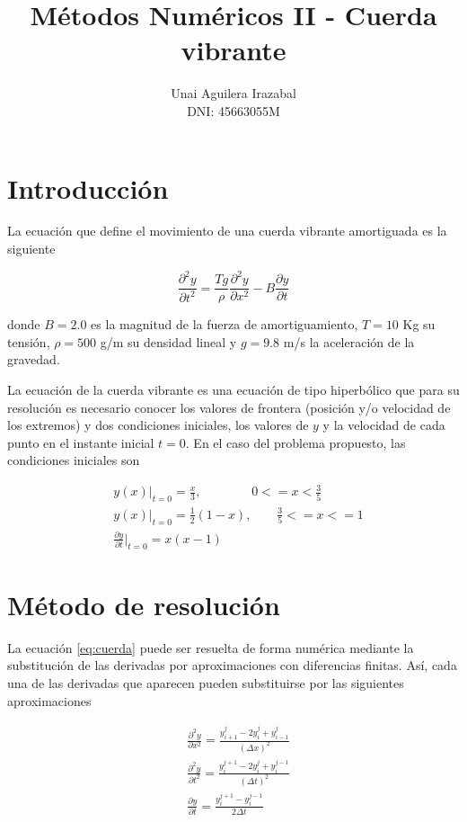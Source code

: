 \documentclass[11pt]{article}
\title{Métodos Numéricos II - Cuerda vibrante}
\author{Unai Aguilera Irazabal\\ DNI: 45663055M}
\begin{document}
\maketitle
\tableofcontents

\pagebreak
\renewcommand{\tablename}{Tabla}

\section{Introducción}
La ecuación que define el movimiento de una cuerda vibrante amortiguada es la siguiente

\begin{equation}
\frac{\partial^2 y}{\partial{t^2}} = \frac{Tg}{\rho}\frac{\partial^2 y}{\partial{x^2}} 
	- B\frac{\partial y}{\partial{t}}
\label{eq:cuerda}
\end{equation}

donde $B=2.0$ es la magnitud de la fuerza de amortiguamiento, $T=10$ Kg su tensión,
$\rho = 500$ g/m su densidad lineal y $g = 9.8$ m/s la aceleración de la gravedad. 

La ecuación de la cuerda vibrante es una ecuación de tipo hiperbólico que para su resolución
es necesario conocer los valores de frontera (posición y/o velocidad de los extremos) y
dos condiciones iniciales, los valores de $y$ y la velocidad de cada punto en el instante
inicial $t=0$.
En el caso del problema propuesto, las condiciones iniciales son

\begin{subequations}
\begin{flalign}
	&y(x)|_{t=0} = \frac{x}{3},~~~~~~~~~~~~~~~~~~ 0 <= x < \frac{3}{5}\\
	&y(x)|_{t=0} = \frac{1}{2}(1 - x),~~~~~~~~~ \frac{3}{5} <= x <= 1\\
	&\frac{\partial{y}}{\partial{t}}|_{t=0} = x(x-1)
\end{flalign}
\label{eq:condiciones_iniciales}
\end{subequations}

\section{Método de resolución}
La ecuación \eqref{eq:cuerda} puede ser resuelta de forma numérica mediante la substitución
de las derivadas por aproximaciones con diferencias finitas. Así, cada una de las derivadas
que aparecen pueden substituirse por las siguientes aproximaciones

\begin{subequations}
\begin{flalign}
	&\frac{\partial^2 y}{\partial{x^2}} = \frac{y^j_{i+1} - 2y^j_i + y^j_{i-1}}{(\Delta{x})^2}\\
	&\frac{\partial^2 y}{\partial{t^2}} = \frac{y^{j+1}_i - 2y^j_i + y^{j-1}_i}{(\Delta{t})^2}\\
	&\frac{\partial{y}}{\partial{t}} = \frac{y^{j+1}_i - y^{j-1}_i}{2\Delta{t}}
\end{flalign}
\end{subequations}
\end{document}
